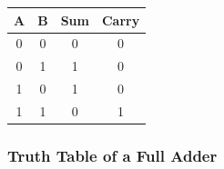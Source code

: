 \documentclass[11pt]{article}
\begin{document}
\begin{table}[H]
	\begin{tabular}{|c|c|c|c|}
		\hline
		{\color[HTML]{000000} \textbf{A}} & {\color[HTML]{000000} \textbf{B}} & {\color[HTML]{000000} \textbf{Sum}} & {\color[HTML]{000000} \textbf{Carry}} \\ \hline
		{\color[HTML]{000000} 0}          & {\color[HTML]{000000} 0}          & {\color[HTML]{CE6301} 0}            & {\color[HTML]{CE6301} 0}              \\ \hline
		{\color[HTML]{000000} 0}          & {\color[HTML]{000000} 1}          & {\color[HTML]{CE6301} 1}            & {\color[HTML]{CE6301} 0}              \\ \hline
		{\color[HTML]{000000} 1}          & {\color[HTML]{000000} 0}          & {\color[HTML]{CE6301} 1}            & {\color[HTML]{CE6301} 0}              \\ \hline
		{\color[HTML]{000000} 1}          & {\color[HTML]{000000} 1}          & {\color[HTML]{CE6301} 0}            & {\color[HTML]{CE6301} 1}              \\ \hline
	\end{tabular}
\end{table}
\subsubsection{Truth Table of a Full Adder}
\end{document}
